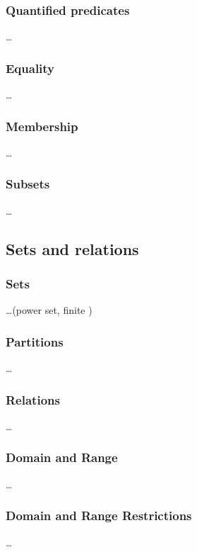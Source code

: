 \subsubsection{Quantified predicates}
\label{quantified_predicates}
\ldots

\subsubsection{Equality}
\label{equality}
\ldots

\subsubsection{Membership}
\label{membership}
\ldots

\subsubsection{Subsets}
\label{subsets}

\ldots

\subsection{Sets and relations}

\subsubsection{Sets}
\label{sets}
\ldots (power set, finite )

\subsubsection{Partitions}
\label{partitions}
\ldots

\subsubsection{Relations}
\label{relations}
\ldots

\subsubsection{Domain and Range}
\label{domain_and_range}
\ldots

\subsubsection{Domain and Range Restrictions}
\label{domain_and_range_restrictions}
\ldots

